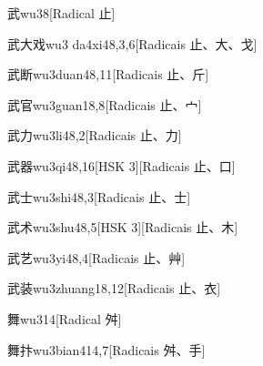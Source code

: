 \begin{entry}{武}{wu3}{8}[Radical ⽌]
\end{entry}

\begin{entry}{武大戏}{wu3 da4xi4}{8,3,6}[Radicais ⽌、⼤、⼽]
\end{entry}

\begin{entry}{武断}{wu3duan4}{8,11}[Radicais ⽌、⽄]
\end{entry}

\begin{entry}{武官}{wu3guan1}{8,8}[Radicais ⽌、⼧]
\end{entry}

\begin{entry}{武力}{wu3li4}{8,2}[Radicais ⽌、⼒]
\end{entry}

\begin{entry}{武器}{wu3qi4}{8,16}[HSK 3][Radicais ⽌、⼝]
\end{entry}

\begin{entry}{武士}{wu3shi4}{8,3}[Radicais ⽌、⼠]
\end{entry}

\begin{entry}{武术}{wu3shu4}{8,5}[HSK 3][Radicais ⽌、⽊]
\end{entry}

\begin{entry}{武艺}{wu3yi4}{8,4}[Radicais ⽌、⾋]
\end{entry}

\begin{entry}{武装}{wu3zhuang1}{8,12}[Radicais ⽌、⾐]
\end{entry}

\begin{entry}{舞}{wu3}{14}[Radical ⾇]
\end{entry}

\begin{entry}{舞抃}{wu3bian4}{14,7}[Radicais ⾇、⼿]
\end{entry}

